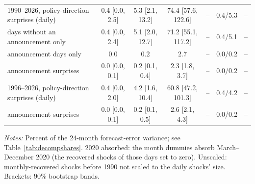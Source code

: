 \begin{table}[tp]
{\begin{tabular}{lcccccc}
1990--2026, policy-direction surprises (daily) & 0.4 {\scriptsize [0.0, 2.5]} & 5.3 {\scriptsize [2.1, 13.2]} & 74.4 {\scriptsize [57.6, 122.6]} & -- & 0.4/5.3 & --\\
\quad days without an announcement only & 0.4 {\scriptsize [0.0, 2.4]} & 5.1 {\scriptsize [2.0, 12.7]} & 71.2 {\scriptsize [55.1, 117.2]} & -- & 0.4/5.1 & --\\
\quad announcement days only & 0.0 & 0.2 & 2.7 & -- & 0.0/0.2 & --\\
\quad announcement surprises & 0.0 {\scriptsize [0.0, 0.1]} & 0.2 {\scriptsize [0.1, 0.4]} & 2.3 {\scriptsize [1.8, 3.7]} & -- & 0.0/0.2 & --\\
1996--2026, policy-direction surprises (daily) & 0.4 {\scriptsize [0.0, 2.0]} & 4.2 {\scriptsize [1.6, 10.4]} & 60.8 {\scriptsize [47.2, 101.3]} & -- & 0.4/4.2 & --\\
\quad announcement surprises & 0.0 {\scriptsize [0.0, 0.1]} & 0.2 {\scriptsize [0.1, 0.5]} & 2.6 {\scriptsize [2.1, 4.3]} & -- & 0.0/0.2 & --\\
\bottomrule\end{tabular}}
\begin{flushleft}\footnotesize\textit{Notes:} Percent of the 24-month forecast-error variance; see Table~\ref{tab:decompshares}. 2020 absorbed: the month dummies absorb March--December 2020 (the recovered shocks of those days set to zero). Unscaled: monthly-recovered shocks before 1990 not scaled to the daily shocks' size. Brackets: 90\% bootstrap bands.\end{flushleft}
\end{table}
